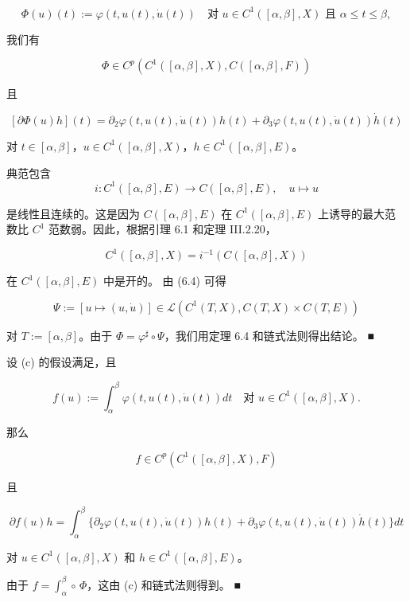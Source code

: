 \begin{example}
\begin{items}
\[
\Phi(u)(t) := \varphi(t, u(t), \dot{u}(t)) \quad \text{对 } u \in C^{1}([\alpha, \beta], X) \text{ 且 } \alpha \le t \le \beta ,
\]

我们有

\[
\Phi \in C^{p}(C^{1}([\alpha, \beta], X), C([\alpha, \beta], F))
\]

且

\[
[\partial\Phi(u)h](t) = \partial_{2}\varphi(t, u(t), \dot{u}(t))h(t) + \partial_{3}\varphi(t, u(t), \dot{u}(t))\dot{h}(t)
\]

对 $ t \in [\alpha, \beta] $，$ u \in C^{1}([\alpha, \beta], X) $，$ h \in C^{1}([\alpha, \beta], E) $。

\proofhead
典范包含
\begin{equation}
i : C^{1}([\alpha, \beta], E) \to C([\alpha, \beta], E) , \quad u \mapsto u\tag{6.4}
\end{equation}

是线性且连续的。这是因为 $ C([\alpha, \beta], E) $ 在 $ C^{1}([\alpha, \beta], E) $ 上诱导的最大范数比 $ C^{1} $ 范数弱。因此，根据引理 6.1 和定理 III.2.20，

\[
C^{1}([\alpha, \beta], X) = i^{-1}(C([\alpha, \beta], X))
\]

在 $ C^{1}([\alpha, \beta], E) $ 中是开的。
由 (6.4) 可得

\[
\Psi := [u \mapsto (u, \dot{u})] \in \mathcal{L}(C^{1}(T, X), C(T, X) \times C(T, E))
\]

对 $ T := [\alpha, \beta] $。由于 $ \Phi = \varphi^{\sharp} \circ \Psi $，我们用定理 6.4 和链式法则得出结论。 \nobreak\hspace{0.35em}■

\item

设 (c) 的假设满足，且

\[
f(u) := \int_{\alpha}^{\beta}\varphi(t, u(t), \dot{u}(t)) dt \quad \text{对 } u \in C^{1}([\alpha, \beta], X) .
\]

那么

\[
f \in C^{p}(C^{1}([\alpha, \beta], X), F)
\]

且

\[
\partial f(u)h = \int_{\alpha}^{\beta}\{\partial_{2}\varphi(t, u(t), \dot{u}(t))h(t) + \partial_{3}\varphi(t, u(t), \dot{u}(t))\dot{h}(t)\} dt
\]

对 $ u \in C^{1}([\alpha, \beta], X) $ 和 $ h \in C^{1}([\alpha, \beta], E) $。

\proofhead
由于 $ f = \int_{\alpha}^{\beta} \circ\, \Phi $，这由 (c) 和链式法则得到。 \nobreak\hspace{0.35em}■
\end{items}

\end{example}


